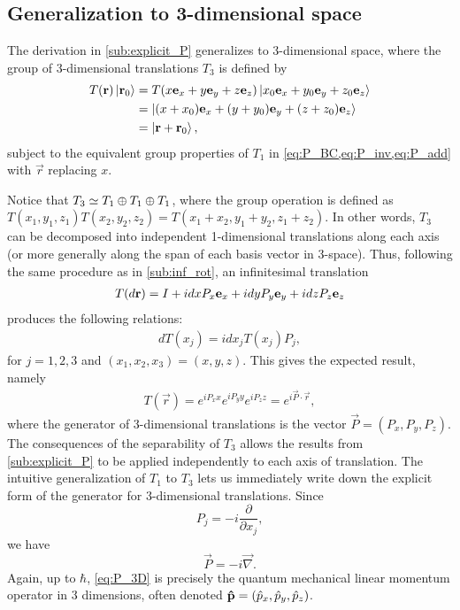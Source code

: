 \subsection{Generalization to 3-dimensional space}\label{sub:3D_translations}
The derivation in \cref{sub:explicit_P} generalizes to 3-dimensional space, where the group of 3-dimensional translations $T_3$ is defined by
\begin{align*}
    T(\mathbf{r})\ket{\mathbf{r}_0}
        &= T(x\mathbf{e}_x + y\mathbf{e}_y + z\mathbf{e}_z)\ket{x_0\mathbf{e}_x + y_0\mathbf{e}_y + z_0\mathbf{e}_z} \\
        &= \ket{(x + x_0)\mathbf{e}_x + (y + y_0)\mathbf{e}_y + (z + z_0)\mathbf{e}_z} \\
        &= \ket{\mathbf{r}+\mathbf{r}_0},
\end{align*}
subject to the equivalent group properties of $T_1$ in \cref{eq:P_BC,eq:P_inv,eq:P_add} with $\vec{r}$ replacing $x$.

\sloppy Notice that $T_3\simeq T_1 \oplus T_1 \oplus T_1$, where the group operation is defined as $T(x_1,y_1,z_1)T(x_2,y_2,z_2) = T(x_1+x_2,y_1+y_2,z_1+z_2)$. In other words, $T_3$ can be decomposed into independent 1-dimensional translations along each axis (or more generally along the span of each basis vector in 3-space). Thus, following the same procedure as in \cref{sub:inf_rot}, an infinitesimal translation
\begin{align*}
    T(d\mathbf{r}) = I + i dx P_x\mathbf{e}_x + idy P_y\mathbf{e}_y + idz P_z\mathbf{e}_z
\end{align*}
produces the following relations:
\begin{align*}
    dT(x_j) = idx_j T(x_j)P_j,
\end{align*}
for $j=1,2,3$ and $(x_1,x_2,x_3) = (x,y,z)$.
This gives the expected result, namely
\begin{align*}
    T(\vec{r}) = e^{iP_x x}e^{iP_y y}e^{iP_z z} = e^{i\vec{P}\cdot\vec{r}},
\end{align*}
where the generator of 3-dimensional translations is the vector $\vec{P}=(P_x,P_y,P_z)$. The consequences of the separability of $T_3$ allows the results from \cref{sub:explicit_P} to be applied independently to each axis of translation. The intuitive generalization of $T_1$ to $T_3$ lets us immediately write down the explicit form of the generator for 3-dimensional translations. Since
\begin{equation}
    P_j = -i\frac{\partial}{\partial x_j},
\end{equation}
we have
\begin{equation}
    \vec{P} = -i\vec{\nabla}.\label{eq:P_3D}
\end{equation}
Again, up to $\hbar$, \cref{eq:P_3D} is precisely the quantum mechanical linear momentum operator in 3 dimensions, often denoted $\mathbf{\hat{p}}=(\hat{p}_x,\hat{p}_y,\hat{p}_z)$.


